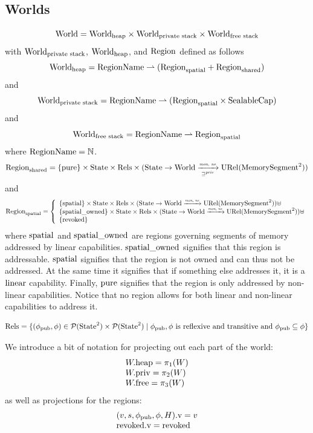 \documentclass[a4paper]{article}
\begin{document}
\subsection{Worlds}
\[
  \World = \Worldh \times \Worlds \times \Worldfs
\]
with $\Worlds$, $\Worldh$, and $\Region$ defined as follows
\[
  \Worldh = \RegionName \parfun (\Regions + \Regionh)
\]
and
\[
  \Worlds = \RegionName \parfun (\Regions \times \SealableCaps)
\]
and
\[
  \Worldfs = \RegionName \parfun \Regions
\]
where $\RegionName = \nats$.
\[
  \Regionh = 
    \{\pure \} \times \State \times \Rels \times (\State \fun \World \monprivnefun \URel{\MemSeg^2})
\]
and
\[
  \Regions = \left\{
  \begin{array}{l}
    \{\spatial \} \times \State \times \Rels \times (\State \fun \World \monnefun \URel{\MemSeg^2}) \uplus \\
    \{\spatialo \} \times \State \times \Rels \times (\State \fun \World \monnefun \URel{\MemSeg^2})\uplus \\ 
    \{\revoked\}
  \end{array} \right.
\]
where $\spatial$ and $\spatialo$ are regions governing segments of memory addressed by linear capabilities. $\spatialo$ signifies that this region is addressable. $\spatial$ signifies that the region is not owned and can thus not be addressed. At the same time it signifies that if something else addresses it, it is a $\linear$ capability. Finally, $\pure$ signifies that the region is only addressed by non-linear capabilities. Notice that no region allows for both linear and non-linear capabilities to address it.

\[
  \Rels = \{(\phi_\pub, \phi) \in \powerset{\State^2}\times \powerset{\State^2} \mid \phi_\pub, \phi \text{ is reflexive and transitive and } \phi_\pub \subseteq \phi \}
\]

We introduce a bit of notation for projecting out each part of the world:
\[
  \begin{array}{l}
    \pwheap = \pi_1(W)\\
    \pwpriv = \pi_2(W)\\
    \pwfree = \pi_3(W)
  \end{array}
\]
as well as projections for the regions:
\[
  \begin{array}{l}
  \prv{(v,s,\phi_\pub,\phi,H)} = v \\
  \prv{\revoked} = \revoked     
  \end{array}
\]
\end{document}
